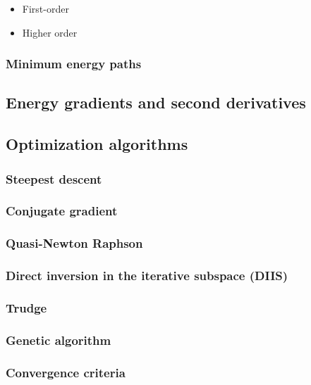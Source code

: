 \documentclass[11pt]{article}
\begin{document}
\begin{itemize}
\item First-order
\label{sec:orge2f8dd2}

\item Higher order
\label{sec:org841ec31}
\end{itemize}

\subsubsection{Minimum energy paths}
\label{sec:orgd43b0ad}

\subsection{Energy gradients and second derivatives}
\label{sec:org70324e3}

\subsection{Optimization algorithms}
\label{sec:org153538c}
\subsubsection{Steepest descent}
\label{sec:orgc644792}

\subsubsection{Conjugate gradient}
\label{sec:org5af7054}

\subsubsection{Quasi-Newton Raphson}
\label{sec:org48c562a}


\subsubsection{Direct inversion in the iterative subspace (DIIS)}
\label{sec:org6558834}
\subsubsection{Trudge}
\label{sec:org950c734}
\subsubsection{Genetic algorithm}
\label{sec:org3acf93c}
\subsubsection{Convergence criteria}
\label{sec:org94e42f8}
\end{document}

